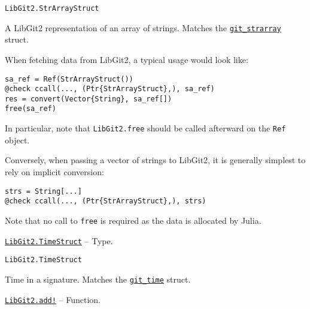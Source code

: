 \begin{adjustwidth}{2em}{0pt}


\begin{verbatim}
LibGit2.StrArrayStruct
\end{verbatim}

A LibGit2 representation of an array of strings. Matches the \href{https://libgit2.org/libgit2/\#HEAD/type/git\_strarray}{\texttt{git\_strarray}} struct.

When fetching data from LibGit2, a typical usage would look like:


\begin{verbatim}
sa_ref = Ref(StrArrayStruct())
@check ccall(..., (Ptr{StrArrayStruct},), sa_ref)
res = convert(Vector{String}, sa_ref[])
free(sa_ref)
\end{verbatim}

In particular, note that \texttt{LibGit2.free} should be called afterward on the \texttt{Ref} object.

Conversely, when passing a vector of strings to LibGit2, it is generally simplest to rely on implicit conversion:


\begin{verbatim}
strs = String[...]
@check ccall(..., (Ptr{StrArrayStruct},), strs)
\end{verbatim}

Note that no call to \texttt{free} is required as the data is allocated by Julia.



\end{adjustwidth}
\hypertarget{11932909532186040994}{}
\hyperlink{11932909532186040994}{\texttt{LibGit2.TimeStruct}}  -- {Type.}

\begin{adjustwidth}{2em}{0pt}


\begin{verbatim}
LibGit2.TimeStruct
\end{verbatim}

Time in a signature. Matches the \href{https://libgit2.org/libgit2/\#HEAD/type/git\_time}{\texttt{git\_time}} struct.



\end{adjustwidth}
\hypertarget{16270901697937111000}{}
\hyperlink{16270901697937111000}{\texttt{LibGit2.add!}}  -- {Function.}

